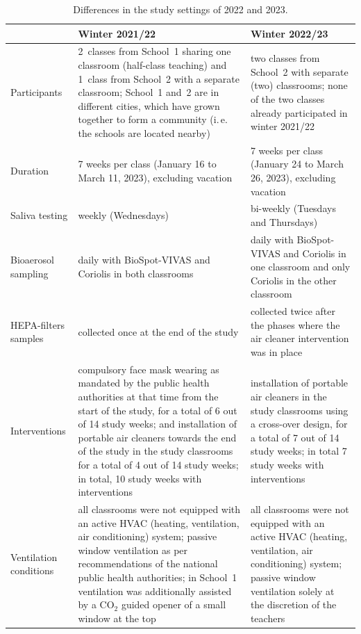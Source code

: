 \documentclass[fleqn,11pt]{wlscirep_supp}
\newcommand\ie{i.\,e.\xspace}
\begin{document}
\appendix

\begin{table}[!htpb]
    \caption{Differences in the study settings of 2022 and 2023.}
    \label{tab:comp_study}
    \centering
    \renewcommand{\arraystretch}{1.5}
    \begin{tabular}{lp{6cm}p{6cm}}
        \toprule
        & \textbf{Winter 2021/22} & \textbf{Winter 2022/23} \\
        \midrule
        Participants & 2~classes from School~1 sharing one classroom (half-class teaching) and 1~class from School~2 with a separate classroom; School~1 and~2 are in different cities, which have grown together to form a community (\ie the schools are located nearby) & two classes from School~2 with separate (two) classrooms; none of the two classes already participated in winter 2021/22 \\
        Duration & 7 weeks per class (January 16 to March 11, 2023), excluding vacation & 7 weeks per class (January 24 to March 26, 2023), excluding vacation \\
        Saliva testing & weekly (Wednesdays) & bi-weekly (Tuesdays and Thursdays) \\
        Bioaerosol sampling & daily with BioSpot-VIVAS and Coriolis in both classrooms & daily with BioSpot-VIVAS and Coriolis in one classroom and only Coriolis in the other classroom \\
        HEPA-filters samples & collected once at the end of the study & collected twice after the phases where the air cleaner intervention was in place \\
        Interventions & compulsory face mask wearing as mandated by the public health authorities at that time from the start of the study, for a total of 6 out of 14 study weeks; and installation of portable air cleaners towards the end of the study in the study classrooms for a total of 4 out of 14 study weeks; in total, 10 study weeks with interventions & installation of portable air cleaners in the study classrooms using a cross-over design, for a total of 7 out of 14 study weeks; in total 7 study weeks with interventions\\
        Ventilation conditions & all classrooms were not equipped with an active HVAC (heating, ventilation, air conditioning) system; passive window ventilation as per recommendations of the national public health authorities; in School~1 ventilation was additionally assisted by a CO$_2$ guided opener of a small window at the top  & all classrooms were not equipped with an active HVAC (heating, ventilation, air conditioning) system; passive window ventilation solely at the discretion of the teachers \\
        \bottomrule
    \end{tabular}
\end{table}
\end{document}
